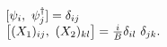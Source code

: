 \begin{equation}
\begin{array}{l}
[ \psi_i,~ \psi_j^{\dag} ]  =  \delta _{ij} \nonumber  \\
\bigl[ (X_1 ) _{ij},~ (X_2 ) _{kl} \bigr]  =  
{i \over B} \delta _{il} ~\delta _{jk}.
\label{CR}
\end{array}
\end{equation}

